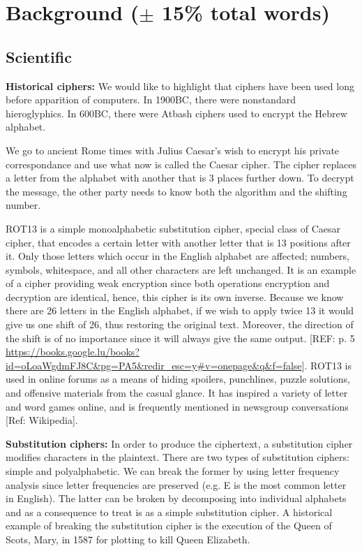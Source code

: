 \section{Background ($\pm$ 15\% total words)}
\subsection{Scientific}

\textbf{Historical ciphers:} We would like to highlight that ciphers have been used long before apparition of computers. In 1900BC, there were nonstandard hieroglyphics. In 600BC, there were Atbash ciphers used to encrypt the Hebrew alphabet. 

We go to ancient Rome times with Julius Caesar's wish to encrypt his private correspondance and use what now is called the Caesar cipher. The cipher replaces a letter from the alphabet with another that is 3 places further down. To decrypt the message, the other party needs to know both the algorithm and the shifting number. 

ROT13 is a simple monoalphabetic substitution cipher, special class of Caesar cipher, that encodes a certain letter with another letter that is 13 positions after it. Only those letters which occur in the English alphabet are affected; numbers, symbols, whitespace, and all other characters are left unchanged. It is an example of a cipher providing weak encryption since both operations encryption and decryption are identical, hence, this cipher is its own inverse.  Because we know there are 26 letters in the English alphabet, if we wish to apply twice 13 it would give us one shift of 26, thus restoring the original text. Moreover, the direction of the shift is of no importance since it will always give the same output. [REF: p. 5 \url{https://books.google.lu/books?id=oLoaWgdmFJ8C&pg=PA5&redir_esc=y#v=onepage&q&f=false}]. 
ROT13 is used in online forums as a means of hiding spoilers, punchlines, puzzle solutions, and offensive materials from the casual glance. It has inspired a variety of letter and word games online, and is frequently mentioned in newsgroup conversations [Ref: Wikipedia]. 

\textbf{Substitution ciphers:} In order to produce the ciphertext, a substitution cipher modifies characters in the plaintext. There are two types of substitution ciphers: simple and polyalphabetic. We can break the former by using letter frequency analysis since letter frequencies are preserved (e.g. E is the most common letter in English). The latter can be broken by decomposing into individual alphabets and as a consequence to treat is as a simple substitution cipher. A historical example of breaking the substitution cipher is the execution of the Queen of Scots, Mary, in 1587 for plotting to kill Queen Elizabeth.


